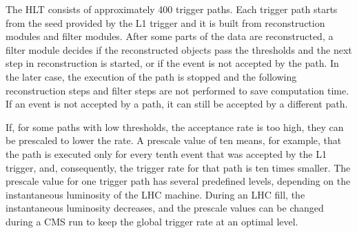 The HLT consists of approximately 400 trigger paths. Each trigger path starts from the seed provided by the L1 trigger and it is built from reconstruction modules and filter modules. After some parts of the data are reconstructed, a filter module decides if the reconstructed objects pass the thresholds and the next step in reconstruction is started, or if the event is not accepted by the path. In the later case, the execution of the path is stopped and the following reconstruction steps and filter steps are not performed to save computation time. 
If an event is not accepted by a path, it can still be accepted by a different path.

If, for some paths with low thresholds, the acceptance rate is too high, they can be prescaled to lower the rate. A prescale value of ten means, for example, that the path is executed only for every tenth event that was accepted by the L1 trigger, and, consequently, the trigger rate for that path is ten times smaller. The prescale value for one trigger path has several predefined levels, depending on the instantaneous luminosity of the LHC machine. During an LHC fill, the instantaneous luminosity decreases, and the prescale values can be changed during a CMS run to keep the global trigger rate at an optimal level.

